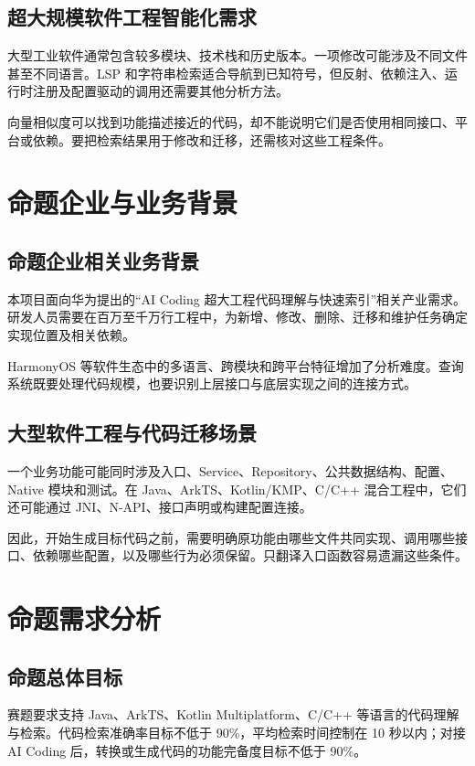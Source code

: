 \subsection{超大规模软件工程智能化需求}

大型工业软件通常包含较多模块、技术栈和历史版本。一项修改可能涉及不同文件甚至不同语言。LSP 和字符串检索适合导航到已知符号，但反射、依赖注入、运行时注册及配置驱动的调用还需要其他分析方法。

向量相似度可以找到功能描述接近的代码，却不能说明它们是否使用相同接口、平台或依赖。要把检索结果用于修改和迁移，还需核对这些工程条件。

\section{命题企业与业务背景}

\subsection{命题企业相关业务背景}

本项目面向华为提出的“AI Coding 超大工程代码理解与快速索引”相关产业需求。研发人员需要在百万至千万行工程中，为新增、修改、删除、迁移和维护任务确定实现位置及相关依赖。

HarmonyOS 等软件生态中的多语言、跨模块和跨平台特征增加了分析难度。查询系统既要处理代码规模，也要识别上层接口与底层实现之间的连接方式。

\subsection{大型软件工程与代码迁移场景}

一个业务功能可能同时涉及入口、Service、Repository、公共数据结构、配置、Native 模块和测试。在 Java、ArkTS、Kotlin/KMP、C/C++ 混合工程中，它们还可能通过 JNI、N-API、接口声明或构建配置连接。

因此，开始生成目标代码之前，需要明确原功能由哪些文件共同实现、调用哪些接口、依赖哪些配置，以及哪些行为必须保留。只翻译入口函数容易遗漏这些条件。

\section{命题需求分析}

\subsection{命题总体目标}

赛题要求支持 Java、ArkTS、Kotlin Multiplatform、C/C++ 等语言的代码理解与检索。代码检索准确率目标不低于 90\%，平均检索时间控制在 10 秒以内；对接 AI Coding 后，转换或生成代码的功能完备度目标不低于 90\%。

